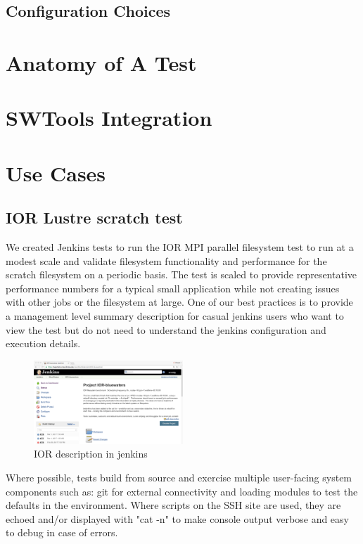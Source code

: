 \documentclass[10pt, conference, compsocconf]{IEEEtran}
\begin{document}
\subsection{Configuration Choices}

\section{Anatomy of A Test}
\label{sec:TestAnatomy}


\section{SWTools Integration}
\label{sec:SWToolsIntegration}


\section{Use Cases}
\label{sec:results}
\subsection{IOR Lustre scratch test}
We created Jenkins tests to run the IOR MPI parallel filesystem test to run at a modest scale and validate filesystem functionality and performance for the scratch filesystem on a periodic basis. The test is scaled to provide representative performance numbers for a typical small application while not creating issues with other jobs or the filesystem at large.  One of our best practices is to provide a management level summary description for casual jenkins users who want to view the test but do not need to understand the jenkins configuration and execution details.  
\begin{figure}[H]
\centering
\includegraphics[width=0.5\textwidth]{IOR-bluewaters-descr}
\caption{ IOR description in jenkins }
\label{fig:IOR-bluewaters-descr}
\end{figure}
Where possible, tests build from source and exercise multiple user-facing system components such as: git for external connectivity and loading modules to test the defaults in the environment.  Where scripts on the SSH site are used, they are echoed and/or displayed with "cat -n" to make console output verbose and easy to debug in case of errors.  
\end{document}
